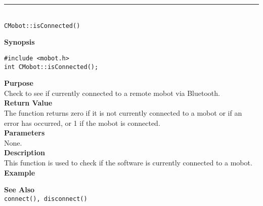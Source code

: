 \noindent
\vspace{5pt}
\rule{4.5in}{0.015in}\\
\noindent
{\LARGE \texttt{CMobot::isConnected()}}\\
{}

\noindent
{\bf Synopsis}
\vspace{-8pt}
\begin{verbatim}
#include <mobot.h>
int CMobot::isConnected();
\end{verbatim}

\noindent
{\bf Purpose}\\
Check to see if currently connected to a remote mobot via Bluetooth.\\

\noindent
{\bf Return Value}\\
The function returns zero if it is not currently connected to a mobot or if an 
error has occurred, or 1 if the mobot is connected.\\

\noindent
{\bf Parameters}\\
None.\\

\noindent
{\bf Description}\\
This function is used to check if the software is currently connected to
a mobot.\\

\noindent
{\bf Example}\\
\noindent

\noindent
{\bf See Also}\\
\texttt{connect(), disconnect()}\\
